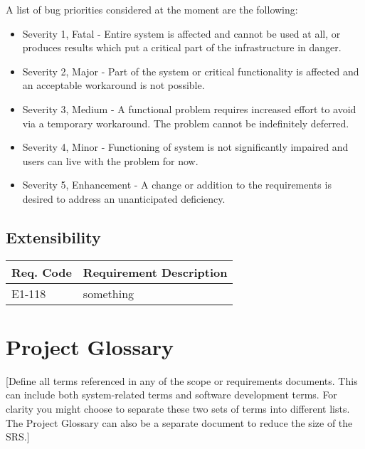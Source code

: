 \documentclass[12pt]{article}
\begin{document}
A list of bug priorities considered at the moment are the following:
\begin{itemize}
	\item Severity 1, Fatal - Entire system is affected and cannot be used at
        all, or produces results which put a critical part of the infrastructure
        in danger.
	\item Severity 2, Major - Part of the system or critical functionality is affected and an acceptable workaround is not possible.
	\item Severity 3, Medium - A functional problem requires increased effort to avoid via a temporary workaround. The problem cannot be indefinitely deferred.
	\item Severity 4, Minor - Functioning of system is not significantly impaired and users can live with the problem for now.
	\item Severity 5, Enhancement - A change or addition to the requirements is desired to address an unanticipated deficiency.
\end{itemize}


\subsection{Extensibility}

\begin{table}[!h]
	\begin{tabular}{| l | l |}
		\hline
		\textbf{Req. Code} & \textbf{Requirement Description}\\
		\hline
		E1-118	& something\\
		\hline
	\end{tabular}
	\label{tab:ExtensibilityRequirements}
\end{table}


\section{Project Glossary}
[Define all terms referenced in any of the scope or requirements documents. This can include both system-related terms and software 
development terms. For clarity you might choose to separate these two sets of terms into different lists. The Project Glossary can 
also be a separate document to reduce the size of the SRS.]
\end{document}
